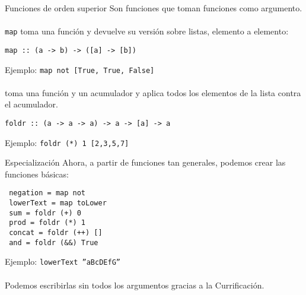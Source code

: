 \begin{frame}[fragile]{Funciones de orden superior}
  Son funciones que toman funciones como argumento.
  \\~\\
  \texttt{map} toma una función y devuelve su versión sobre listas,
  elemento a elemento:
  \begin{lstlisting}
map :: (a -> b) -> ([a] -> [b])
  \end{lstlisting}
  Ejemplo: \texttt{map not [True, True, False]}
  \\~\\
   toma una función y un acumulador y aplica todos los elementos
  de la lista contra el acumulador.
  \begin{lstlisting}
foldr :: (a -> a -> a) -> a -> [a] -> a
  \end{lstlisting}
  Ejemplo: \texttt{foldr (*) 1 [2,3,5,7]}
\end{frame}

\begin{frame}[fragile]{Especialización}
  Ahora, a partir de funciones tan generales, podemos crear las funciones básicas:
  \begin{lstlisting}
 negation = map not
 lowerText = map toLower
 sum = foldr (+) 0
 prod = foldr (*) 1
 concat = foldr (++) []
 and = foldr (&&) True
  \end{lstlisting}
  Ejemplo: \texttt{lowerText ''aBcDEfG''}
  \\~\\
  Podemos escribirlas sin todos los argumentos gracias a la Currificación.
\end{frame}